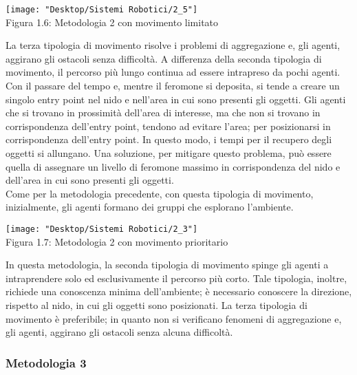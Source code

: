 \documentclass[12pt,a4paper,openright,twoside]{report}
\begin{document}
\begin{center}  
	\texttt{[image: "Desktop/Sistemi Robotici/2\_5"]}
	\\Figura 1.6: Metodologia 2 con movimento limitato
\end{center}

La terza tipologia di movimento risolve i problemi di aggregazione e, gli agenti, aggirano gli ostacoli senza difficoltà. A differenza della seconda tipologia di movimento, il percorso più lungo continua ad essere intrapreso da pochi agenti.
Con il passare del tempo e, mentre il feromone si deposita, si tende a creare un singolo entry point nel nido e nell'area in cui sono presenti gli oggetti. Gli agenti che si trovano in prossimità dell'area di interesse, ma che non si trovano in corrispondenza dell'entry point, tendono ad evitare l'area; per posizionarsi in corrispondenza dell'entry point. In questo modo, i tempi per il recupero degli oggetti si allungano. Una soluzione, per mitigare questo problema, può essere quella di assegnare un livello di feromone massimo in corrispondenza del nido e dell'area in cui sono presenti gli oggetti.\\
Come per la metodologia precedente, con questa tipologia di movimento, inizialmente, gli agenti formano dei gruppi che esplorano l'ambiente.\\
 
\begin{center}  
	\texttt{[image: "Desktop/Sistemi Robotici/2\_3"]}
	\\Figura 1.7: Metodologia 2 con movimento prioritario
\end{center} 
  
In questa metodologia, la seconda tipologia di movimento spinge gli agenti a intraprendere solo ed esclusivamente il percorso più corto. Tale tipologia, inoltre, richiede una conoscenza minima dell'ambiente; è necessario conoscere la direzione, rispetto al nido, in cui gli oggetti sono posizionati. La terza tipologia di movimento è preferibile; in quanto non si verificano fenomeni di aggregazione e, gli agenti, aggirano gli ostacoli senza alcuna difficoltà.\\

\subsubsection{Metodologia 3}
\end{document}
